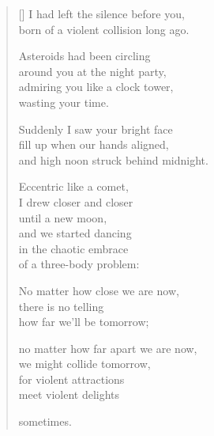 \documentclass[12pt,a4paper]{article}
\begin{document}
\thispagestyle{empty}


\settowidth{\versewidth}{born of a violent collision long ago.}

\bigskip

\begin{verse}[\versewidth]
I had left the silence before you, \\
born of a violent collision long ago.

Asteroids had been circling \\
around you at the night party, \\
admiring you like a clock tower, \\
wasting your time.

Suddenly I saw your bright face \\
fill up when our hands aligned, \\
and high noon struck behind midnight.

Eccentric like a comet, \\
I drew closer and closer \\
until a new moon, \\
and we started dancing \\
in the chaotic embrace \\
of a three-body problem:

No matter how close we are now, \\
there is no telling \\
how far we'll be tomorrow;

no matter how far apart we are now, \\
we might collide tomorrow, \\
for violent attractions \\
meet violent delights

sometimes.
\end{verse}
\end{document}

